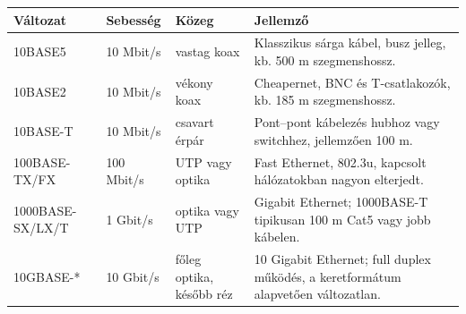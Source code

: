 
\begin{tabularx}{\textwidth}{L{30mm}L{24mm}L{32mm}X}
\toprule
\textbf{Változat} & \textbf{Sebesség} & \textbf{Közeg} & \textbf{Jellemző} \\
\midrule
10BASE5 & 10 Mbit/s & vastag koax & Klasszikus sárga kábel, busz jelleg, kb. 500 m szegmenshossz. \\
10BASE2 & 10 Mbit/s & vékony koax & Cheapernet, BNC és T-csatlakozók, kb. 185 m szegmenshossz. \\
10BASE-T & 10 Mbit/s & csavart érpár & Pont--pont kábelezés hubhoz vagy switchhez, jellemzően 100 m. \\
100BASE-TX/FX & 100 Mbit/s & UTP vagy optika & Fast Ethernet, 802.3u, kapcsolt hálózatokban nagyon elterjedt. \\
1000BASE-SX/LX/T & 1 Gbit/s & optika vagy UTP & Gigabit Ethernet; 1000BASE-T tipikusan 100 m Cat5 vagy jobb kábelen. \\
10GBASE-* & 10 Gbit/s & főleg optika, később réz & 10 Gigabit Ethernet; full duplex működés, a keretformátum alapvetően változatlan. \\
\bottomrule
\end{tabularx}
